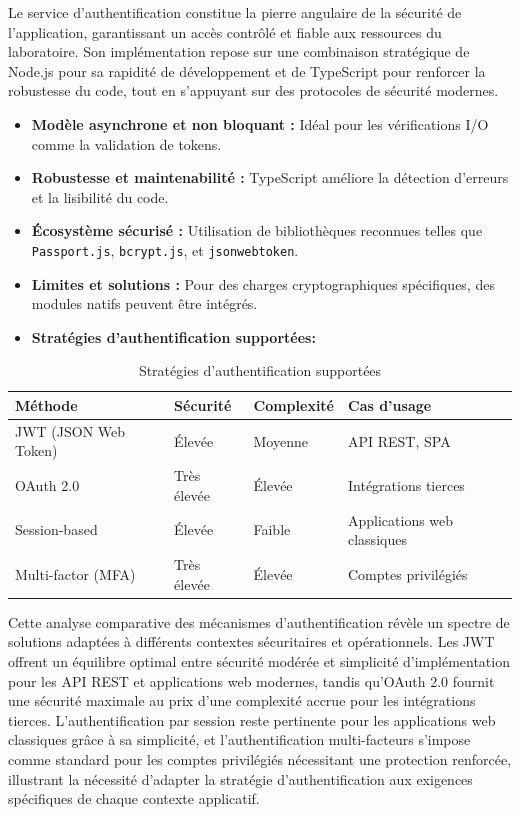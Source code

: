 \documentclass[12pt]{rapportPfe}
\begin{document}
Le service d'authentification constitue la pierre angulaire de la sécurité de l'application, garantissant un accès contrôlé et fiable aux ressources du laboratoire. Son implémentation repose sur une combinaison stratégique de Node.js pour sa rapidité de développement et de TypeScript pour renforcer la robustesse du code, tout en s'appuyant sur des protocoles de sécurité modernes.

\begin{itemize}
    \item \textbf{Modèle asynchrone et non bloquant :} Idéal pour les vérifications I/O comme la validation de tokens.
    \item \textbf{Robustesse et maintenabilité :} TypeScript améliore la détection d’erreurs et la lisibilité du code.
    \item \textbf{Écosystème sécurisé :} Utilisation de bibliothèques reconnues telles que \texttt{Passport.js}, \texttt{bcrypt.js}, et \texttt{jsonwebtoken}.
    \item \textbf{Limites et solutions :} Pour des charges cryptographiques spécifiques, des modules natifs peuvent être intégrés.
    \item \textbf{Stratégies d'authentification supportées:}
\end{itemize}

\begin{table}[ht]
\centering
\begin{tabular}{| >{\raggedright\arraybackslash}p{4cm} 
                | >{\raggedright\arraybackslash}p{3cm} 
                | >{\raggedright\arraybackslash}p{3cm} 
                | >{\raggedright\arraybackslash}p{5cm} |}
\hline
\textbf{Méthode} & \textbf{Sécurité} & \textbf{Complexité} & \textbf{Cas d'usage} \\
\hline
JWT (JSON Web Token) & Élevée & Moyenne & API REST, SPA \\
\hline
OAuth 2.0 & Très élevée & Élevée & Intégrations tierces \\
\hline
Session-based & Élevée & Faible & Applications web classiques \\
\hline
Multi-factor (MFA) & Très élevée & Élevée & Comptes privilégiés \\
\hline
\end{tabular}
\caption{Stratégies d'authentification supportées}
\label{tab:auth-aupported}
\end{table}

Cette analyse comparative des mécanismes d'authentification révèle un spectre de solutions adaptées à différents contextes sécuritaires et opérationnels. Les JWT offrent un équilibre optimal entre sécurité modérée et simplicité d'implémentation pour les API REST et applications web modernes, tandis qu'OAuth 2.0 fournit une sécurité maximale au prix d'une complexité accrue pour les intégrations tierces. L'authentification par session reste pertinente pour les applications web classiques grâce à sa simplicité, et l'authentification multi-facteurs s'impose comme standard pour les comptes privilégiés nécessitant une protection renforcée, illustrant la nécessité d'adapter la stratégie d'authentification aux exigences spécifiques de chaque contexte applicatif.
\end{document}

